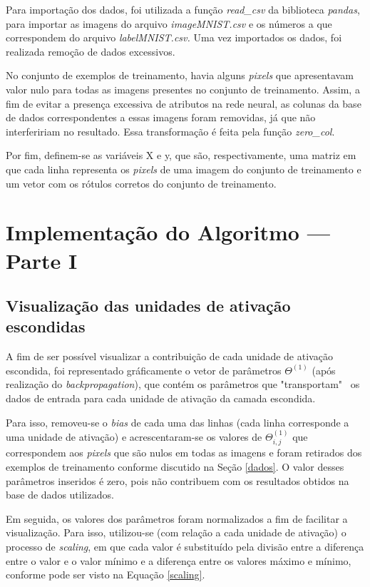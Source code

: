 \documentclass[12pt]{article}
\begin{document}
Para importação dos dados, foi utilizada a função \textit{read\_csv} da biblioteca \textit{pandas}, para importar as imagens do arquivo \textit{imageMNIST.csv} e os números a que correspondem do arquivo \textit{labelMNIST.csv.} Uma vez importados os dados, foi realizada remoção de dados excessivos.

No conjunto de exemplos de treinamento, havia alguns \textit{pixels} que apresentavam valor nulo para todas as imagens presentes no conjunto de treinamento. Assim, a fim de evitar a presença excessiva de atributos na rede neural, as colunas da base de dados correspondentes a essas imagens foram removidas, já que não interfeririam no resultado. Essa transformação é feita pela função \textit{zero\_col}.

Por fim, definem-se as variáveis X e y, que são, respectivamente, uma matriz em que cada linha representa os \textit{pixels} de uma imagem do conjunto de treinamento e um vetor com os rótulos corretos do conjunto de treinamento.

\section{Implementação do Algoritmo --- Parte I} \label{parte1}

\subsection{Visualização das unidades de ativação escondidas}
A fim de ser possível visualizar a contribuição de cada unidade de ativação escondida, foi representado gráficamente o vetor de parâmetros $\Theta^{(1)}$ (após realização do \textit{backpropagation}), que contém os parâmetros que "transportam" \ os dados de entrada para cada unidade de ativação da camada escondida.

Para isso, removeu-se o \textit{bias} de cada uma das linhas (cada linha corresponde a uma unidade de ativação) e acrescentaram-se os valores de $\Theta^{(1)}_{i,j}$ que correspondem aos \textit{pixels} que são nulos em todas as imagens e foram retirados dos exemplos de treinamento conforme discutido na Seção \ref{dados}. O valor desses parâmetros inseridos é zero, pois não contribuem com os resultados obtidos na base de dados utilizados.

Em seguida, os valores dos parâmetros foram normalizados a fim de facilitar a visualização. Para isso, utilizou-se (com relação a cada unidade de ativação) o processo de \textit{scaling}, em que cada valor é substituído pela divisão entre a diferença entre o valor e o valor mínimo e a diferença entre os valores máximo e mínimo, conforme pode ser visto na Equação \ref{scaling}.
\end{document}
